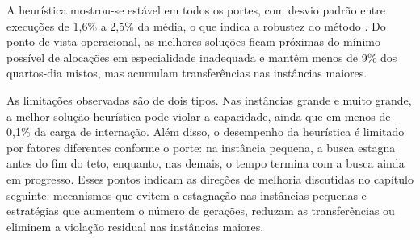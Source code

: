 A heurística mostrou-se estável em todos os portes, com desvio padrão entre execuções de 1,6\% a 2,5\% da média, o que indica a robustez do método \cite{talbi2009metaheuristics}. Do ponto de vista operacional, as melhores soluções ficam próximas do mínimo possível de alocações em especialidade inadequada e mantêm menos de 9\% dos quartos-dia mistos, mas acumulam transferências nas instâncias maiores.

As limitações observadas são de dois tipos. Nas instâncias grande e muito grande, a melhor solução heurística pode violar a capacidade, ainda que em menos de 0,1\% da carga de internação. Além disso, o desempenho da heurística é limitado por fatores diferentes conforme o porte: na instância pequena, a busca estagna antes do fim do teto, enquanto, nas demais, o tempo termina com a busca ainda em progresso. Esses pontos indicam as direções de melhoria discutidas no capítulo seguinte: mecanismos que evitem a estagnação nas instâncias pequenas e estratégias que aumentem o número de gerações, reduzam as transferências ou eliminem a violação residual nas instâncias maiores.
